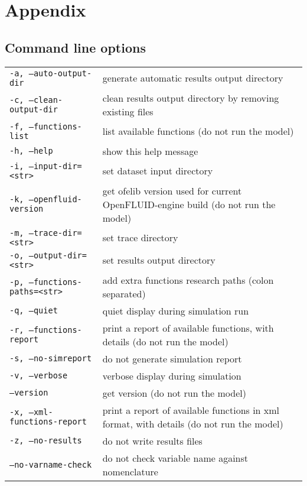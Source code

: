 \chapter{Appendix}


\section{Command line options}

\begin{center}
\begin{tabularx}{\linewidth}{lX}
\texttt{-a, --auto-output-dir}&generate automatic results output directory\\
\texttt{-c, --clean-output-dir}&clean results output directory by removing existing files\\
\texttt{-f, --functions-list}&list available functions (do not run the model)\\
\texttt{-h, --help}&show this help message\\
\texttt{-i, --input-dir=<str>}&set dataset input directory\\
\texttt{-k, --openfluid-version}&get ofelib version used for current OpenFLUID-engine build (do not run the model)\\
\texttt{-m, --trace-dir=<str>}&set trace directory\\
\texttt{-o, --output-dir=<str>}&set results output directory\\
\texttt{-p, --functions-paths=<str>}&add extra functions research paths (colon separated)\\
\texttt{-q, --quiet}&quiet display during simulation run\\
\texttt{-r, --functions-report}&print a report of available functions, with details (do not run the model)\\
\texttt{-s, --no-simreport}&do not generate simulation report\\
\texttt{-v, --verbose}&verbose display during simulation\\
\texttt{--version}&get version (do not run the model)\\
\texttt{-x, --xml-functions-report}&print a report of available functions in xml format, with details (do not run the model)\\
\texttt{-z, --no-results}&do not write results files\\
\texttt{--no-varname-check}&do not check variable name against nomenclature\\
\end{tabularx}
\end{center}

